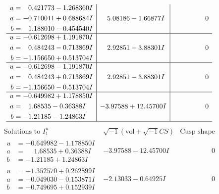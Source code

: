 \documentclass[1p]{elsarticle_modified}
\theoremstyle{definition}
\newcommand{\I}{\sqrt{-1}}
\begin{document}
$$\begin{array}{c|c|c}
\begin{aligned}
u &= \phantom{-}0.421773 - 1.268360 I \\
a &= -0.710011 + 0.688684 I \\
b &= \phantom{-}1.188010 - 0.454540 I\end{aligned}
 & \phantom{-}5.08186 - 1.66877 I & \phantom{-0.000000 } 0 \\ \hline\begin{aligned}
u &= -0.612698 + 1.191870 I \\
a &= \phantom{-}0.484243 - 0.713869 I \\
b &= -1.156650 + 0.513704 I\end{aligned}
 & \phantom{-}2.92851 + 3.88301 I & \phantom{-0.000000 } 0 \\ \hline\begin{aligned}
u &= -0.612698 - 1.191870 I \\
a &= \phantom{-}0.484243 + 0.713869 I \\
b &= -1.156650 - 0.513704 I\end{aligned}
 & \phantom{-}2.92851 - 3.88301 I & \phantom{-0.000000 } 0 \\ \hline\begin{aligned}
u &= -0.649982 + 1.178850 I \\
a &= \phantom{-}1.68535 - 0.36388 I \\
b &= -1.21185 - 1.24863 I\end{aligned}
 & -3.97588 + 12.45700 I & \phantom{-0.000000 } 0\\
 \hline 
 \end{array}$$\newpage$$\begin{array}{c|c|c}  
\text{Solutions to }I^u_{1}& \I (\text{vol} + \sqrt{-1}CS) & \text{Cusp shape}\\
 \hline 
\begin{aligned}
u &= -0.649982 - 1.178850 I \\
a &= \phantom{-}1.68535 + 0.36388 I \\
b &= -1.21185 + 1.24863 I\end{aligned}
 & -3.97588 - 12.45700 I & \phantom{-0.000000 } 0 \\ \hline\begin{aligned}
u &= -1.352570 + 0.262899 I \\
a &= -0.049030 - 0.153871 I \\
b &= -0.749695 + 0.152939 I\end{aligned}
 & -2.13033 - 0.64925 I & \phantom{-0.000000 } 0 \\ \hline\begin{aligned}

\end{aligned}
\end{array}$$
\end{document}
